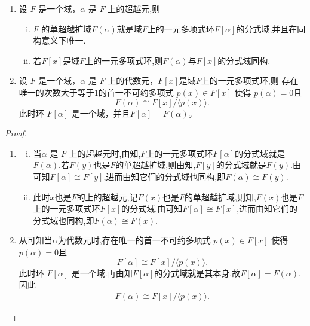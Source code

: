 \documentclass[../../main.tex]{subfiles}%
\begin{document}
\begin{theorem}\label{theorem:单代数和超越扩域的基本结论}
\begin{enumerate}[(1)]
\item\label{theorem:单代数和超越扩域的基本结论-1} 设 \( F \) 是一个域，\(\alpha\) 是 \( F \) 上的超越元,则
\begin{enumerate}[(i)]
\item \( F \) 的单超越扩域$F(\alpha)$就是域$F$上的一元多项式环$F[\alpha]$的分式域,并且在同构意义下唯一.

\item 若$F[x]$是域$F$上的一元多项式环,则\( F(\alpha) \)与$F[x]$的分式域同构.
\end{enumerate}

\item\label{theorem:单代数和超越扩域的基本结论-2} 设 \( F \) 是一个域，\( \alpha \) 是 \( F \) 上的代数元，$F[x]$是域$F$上的一元多项式环,则
存在唯一的次数大于等于1的首一不可约多项式 \( p(x) \in F[x] \) 使得 \( p(\alpha) = 0 \)且
\[
F(\alpha) \cong F[x] / \langle p(x) \rangle.
\]
此时环 \( F[\alpha] \) 是一个域，并且\( F[\alpha] = F(\alpha) \)。
\end{enumerate}
\end{theorem}
\begin{proof}
\begin{enumerate}[(1)]
\item \begin{enumerate}[(i)]
\item 当\(\alpha\) 是 \( F \) 上的超越元时,由知,$F$上的一元多项式环$F[\alpha]$的分式域就是$F(\alpha)$.若$F(y)$也是$F$的单超越扩域,则由知,$F[y]$的分式域就是$F(y)$.由可知$F[\alpha]\cong F[y]$,进而由知它们的分式域也同构,即$F(\alpha)\cong F(y)$.

\item 此时$x$也是$F$的上的超越元,记$F(x)$也是$F$的单超越扩域,则知,$F(x)$也是$F$上的一元多项式环$F[x]$的分式域.由可知$F[\alpha]\cong F[x]$,进而由知它们的分式域也同构,即$F(\alpha)\cong F(x)$.

\end{enumerate}

\item 从可知当$\alpha$为代数元时,存在唯一的首一不可约多项式 \( p(x) \in F[x] \) 使得 \( p(\alpha) = 0 \)且
\[
F[\alpha] \cong F[x] / \langle p(x) \rangle.
\]
此时环 \( F[\alpha] \) 是一个域.再由知$F[\alpha]$的分式域就是其本身,故$F[\alpha]=F(\alpha)$.因此
\begin{align*}
F(\alpha) \cong F[x] / \langle p(x) \rangle.
\end{align*}
\end{enumerate}
\end{proof}
\end{document}
